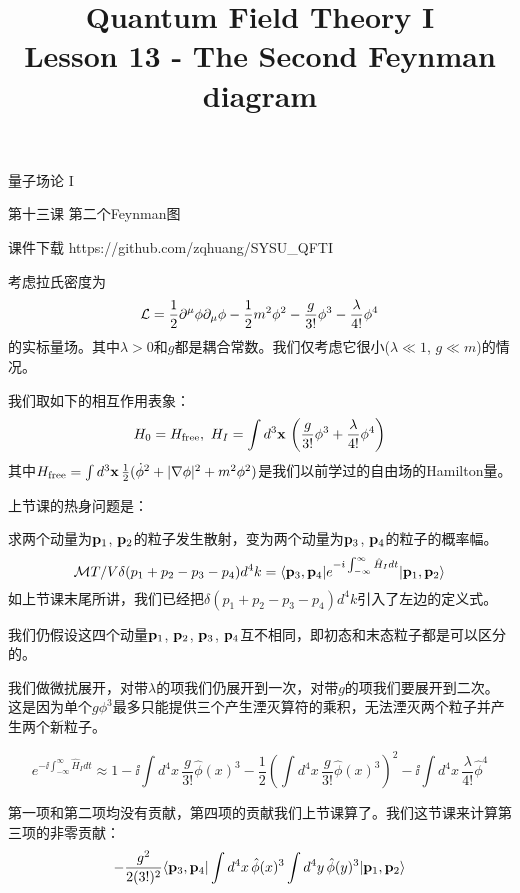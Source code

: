 \documentclass[CJK]{beamer}
\title{Quantum Field Theory I \\ Lesson 13 - The Second Feynman diagram}
\author{}
\date{}
\begin{document}
\begin{frame}
 
\begin{center}
\begin{Large}
\bch
量子场论 I 

{\vskip 0.3in}

第十三课 第二个Feynman图

\ech
\end{Large}
\end{center}

\vskip 0.2in

\bch
课件下载
\ech
https://github.com/zqhuang/SYSU\_QFTI

\end{frame}


\begin{frame} 
\bch
考虑拉氏密度为
$${\mathcal{L}} = \frac{1}{2}\partial^\mu\phi\partial_\mu\phi - \frac{1}{2}m^2\phi^2 - \frac{g}{3!}\phi^3- \frac{\lambda}{4!}\phi^4$$
的实标量场。其中$\lambda>0$和$g$都是耦合常数。我们仅考虑它很小($\lambda \ll 1$, $g\ll m$)的情况。

我们取如下的相互作用表象：
$$ H_0 = H_{\rm free},\ H_I = \int d^3{\mathbf{x}}\, \left(\frac{g}{3!}\phi^3 + \frac{\lambda}{4!} \phi^4\right)$$
其中$H_{\rm free} = \int d^3{\mathbf{x}}\, \frac{1}{2}(\dot\phi^2 + |\nabla \phi|^2 + m^2\phi^2)$是我们以前学过的自由场的Hamilton量。

\ech
\end{frame}

\begin{frame} 
\bch
上节课的热身问题是：
\skipline

求两个动量为${\mathbf{p}}_1$, ${\mathbf{p}}_2$的粒子发生散射，变为两个动量为${\mathbf{p}}_3$, ${\mathbf{p}}_4$的粒子的概率幅。
$${\mathcal{M}} T/V \delta(p_1+p_2-p_3-p_4)d^4k= \langle {\mathbf{p}}_3, {\mathbf{p}}_4|  e^{-{\dot{\imath}}\int_{-\infty}^\infty \hat{H}_I dt}|{\mathbf{p}}_1,{\mathbf{p}}_2\rangle$$
如上节课末尾所讲，我们已经把$\delta(p_1+p_2-p_3-p_4)d^4k$引入了左边的定义式。
\skipline

我们仍假设这四个动量${\mathbf{p}}_1$, ${\mathbf{p}}_2$, ${\mathbf{p}}_3$, ${\mathbf{p}}_4$互不相同，即初态和末态粒子都是可以区分的。
\ech
\end{frame}

\begin{frame} 
\bch
{\small 
我们做微扰展开，对带$\lambda$的项我们仍展开到一次，对带$g$的项我们要展开到二次。这是因为单个$g\phi^3$最多只能提供三个产生湮灭算符的乘积，无法湮灭两个粒子并产生两个新粒子。

$$e^{-\ii\int_{-\infty}^\infty \hat{H}_I dt}\approx 1-\ii\int d^4x\,\frac{g}{3!}\hat\phi(x)^3 -\frac{1}{2}\left(\int d^4x\,\frac{g}{3!}\hat\phi(x)^3\right)^2- \ii\int d^4x\, \frac{\lambda}{4!}\hat\phi^4 $$

第一项和第二项均没有贡献，第四项的贡献我们上节课算了。我们这节课来计算第三项的非零贡献：
$$ -\frac{g^2}{2(3!)^2} \langle {\mathbf{p}}_3, {\mathbf{p}}_4| \int d^4x\, \hat\phi(x)^3 \int d^4y\, \hat\phi(y)^3 |{\mathbf{p}}_1,{\mathbf{p}}_2\rangle$$
}
\ech
\end{frame}
\end{document}

